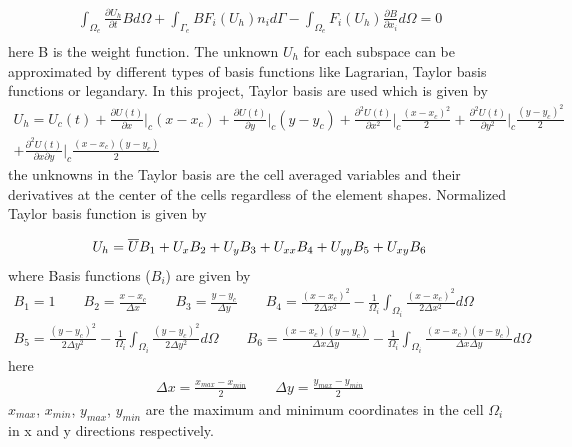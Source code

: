 \documentclass[12pt]{elsarticle}
\begin{document}
	\begin{equation}\label{gaussdiv}
		\begin{gathered}
			\int_{\Omega_e} \frac{\partial U_h}{\partial t} B d\Omega + \int_{\Gamma_e} B F_i(U_h) n_i d\Gamma - \int_{\Omega_e} F_i (U_h)\frac{\partial B}{\partial x_i}  d\Omega=0\\
		\end{gathered}
	\end{equation}
	here B is the weight function. The unknown $U_h$ for each subspace can be approximated by different types of basis functions like Lagrarian, Taylor basis functions or legandary. In this project, Taylor basis are used which is given by
	\begin{equation}
		\begin{gathered}
			U_h=U_c(t)+\frac{\partial U(t)}{\partial x}\Big|_c (x-x_c)+\frac{\partial U(t)}{\partial y}\Big|_c(y-y_c)+\frac{\partial^2 U(t)}{\partial x^2}\Big|_c \frac{(x-x_c)^2}{2}+\frac{\partial^2 U(t)}{\partial y^2}\Big|_c \frac{(y-y_c)^2}{2}\\
			+\frac{\partial^2 U(t)}{\partial x \partial y}\Big|_c \frac{(x-x_c)(y-y_c)}{2}
		\end{gathered}
	\end{equation}
	the unknowns in the Taylor basis are the cell averaged variables and their derivatives at the center of the cells regardless of the element shapes. Normalized Taylor basis function is given by
	
	\begin{equation}
		U_h=\overline{U}B_1+U_x B_2+U_y B_3+U_{xx} B_4+U_{yy} B_5+U_{xy} B_6\\
	\end{equation}
	where Basis functions ($B_i$) are given by
	\begin{equation}
		\begin{gathered}
			B_1=1 \qquad B_2= \frac{x-x_c}{\Delta x} \qquad B_3=\frac{y-y_c}{\Delta y} \qquad B_4=\frac{(x-x_c)^2}{2 \Delta x^2}-\frac{1}{\Omega_i} \int_{\Omega_i}\frac{(x-x_c)^2}{2 \Delta x^2} d \Omega\\
			B_5=\frac{(y-y_c)^2}{2 \Delta y^2}-\frac{1}{\Omega_i} \int_{\Omega_i}\frac{(y-y_c)^2}{2 \Delta y^2} d \Omega \qquad B_6=\frac{(x-x_c)(y-y_c)}{\Delta x \Delta y}-\frac{1}{\Omega_i} \int_{\Omega_i}\frac{(x-x_c) (y-y_c)}{ \Delta x \Delta y} d \Omega
		\end{gathered}
	\end{equation}
	here
	\begin{equation}
		\begin{gathered}
			\Delta x= \frac{x_{max}-x_{min}}{2} \qquad \Delta y= \frac{y_{max}-y_{min}}{2}
		\end{gathered}
	\end{equation}
	$x_{max}$, $x_{min}$, $y_{max}$, $y_{min}$ are the maximum and minimum coordinates in the cell $\Omega_i$ in x and y directions respectively. 
\end{document}
